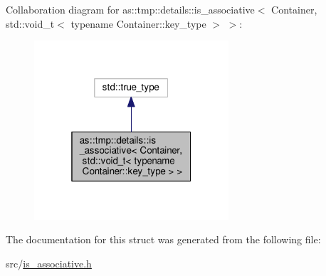 Collaboration diagram for as\+:\+:tmp\+:\+:details\+:\+:is\+\_\+associative$<$ Container, std\+:\+:void\+\_\+t$<$ typename Container\+:\+:key\+\_\+type $>$ $>$\+:\nopagebreak
\begin{figure}[H]
\begin{center}
\leavevmode
\includegraphics[width=205pt]{structas_1_1tmp_1_1details_1_1is__associative_3_01Container_00_01std_1_1void__t_3_01typename_01Caac0f829afd0b76a0bf08a7b10e9df26}
\end{center}
\end{figure}


The documentation for this struct was generated from the following file\+:\begin{DoxyCompactItemize}
\item 
src/\hyperlink{is__associative_8h}{is\+\_\+associative.\+h}\end{DoxyCompactItemize}
